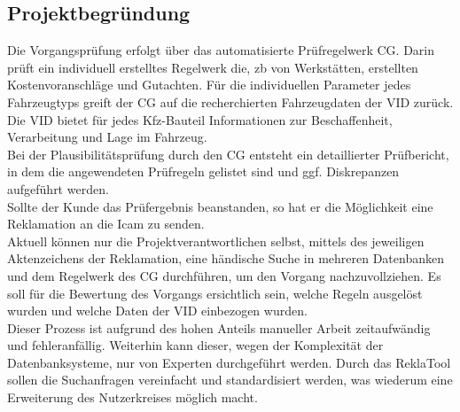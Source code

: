 \subsection{Projektbegründung} 
\label{sec:Projektbegruendung}
Die Vorgangsprüfung erfolgt über das automatisierte Prüfregelwerk \ac{CG}.
Darin prüft ein individuell erstelltes Regelwerk die, \acs{zb} von Werkstätten, erstellten
Kostenvoranschläge und Gutachten. Für die individuellen Parameter jedes Fahrzeugtyps greift
der \acs{CG} auf die recherchierten Fahrzeugdaten der \ac{VID} zurück. 
Die \acs{VID} bietet für jedes Kfz-Bauteil Informationen zur Beschaffenheit, Verarbeitung und Lage im Fahrzeug.\\
Bei der Plausibilitätsprüfung durch den \acs{CG} entsteht ein detaillierter Prüfbericht, in dem die
angewendeten Prüfregeln gelistet sind und ggf. Diskrepanzen aufgeführt werden.\\
Sollte der Kunde das Prüfergebnis beanstanden, so hat er die Möglichkeit eine Reklamation an
die \acs{Icam} zu senden.\\
Aktuell können nur die Projektverantwortlichen selbst, mittels des jeweiligen Aktenzeichens der
Reklamation, eine händische Suche in mehreren Datenbanken und dem Regelwerk des \acs{CG}
durchführen, um den Vorgang nachzuvollziehen. Es soll für die Bewertung des Vorgangs
ersichtlich sein, welche Regeln ausgelöst wurden und welche Daten der \acs{VID} einbezogen wurden.\\
Dieser Prozess ist aufgrund des hohen Anteils manueller Arbeit zeitaufwändig und fehleranfällig.
Weiterhin kann dieser, wegen der Komplexität der Datenbanksysteme, nur von Experten durchgeführt werden.
Durch das ReklaTool sollen die Suchanfragen vereinfacht und standardisiert werden, was wiederum 
eine Erweiterung des Nutzerkreises möglich macht.

